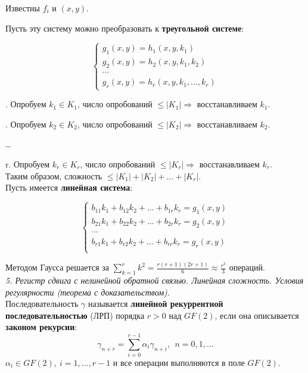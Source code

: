 \noindent Известны $f_i$ и $(x, y)$.

Пусть эту систему можно преобразовать к \textbf{треугольной системе}:

\begin{equation*}
    \begin{cases}
    g_1 (x, y) = h_1 (x, y, k_1) \\
    g_2 (x, y) = h_2 (x, y, k_1, k_2) \\
    \cdots \\
    g_r (x, y) = h_r (x, y, k_1, \ldots, k_r) 
    \end{cases}
\end{equation*}

. Опробуем $k_1 \in K_1$, число опробований $\le |K_1| \Rightarrow$ восстанавливаем $k_1$.

. Опробуем $k_2 \in K_2$, число опробований $\le |K_2| \Rightarrow$ восстанавливаем $k_2$.

\noindent \ldots

\noindent r. Опробуем $k_r \in K_r$, число опробований $\le |K_r| \Rightarrow$ восстанавливаем $k_r$. \\

\noindent Таким образом, сложность $\le |K_1| + |K_2| + \ldots + |K_r|$. \\

Пусть имеется \textbf{линейная система}:

\begin{equation*}
    \begin{cases}
    b_{11} k_1 + b_{12} k_2 + \ldots + b_{1r} k_r = g_1 (x, y)  \\
    b_{21} k_1 + b_{22} k_2 + \ldots + b_{2r} k_r = g_2 (x, y)  \\
    \cdots \\
    b_{r1} k_1 + b_{r2} k_2 + \ldots + b_{rr} k_r = g_r (x, y)  \\
    \end{cases}
\end{equation*}

\noindent Методом Гаусса решается за $\sum_{k=1}^r k^2 = \frac{r(r + 1)(2 r + 1)}{6} \approx \frac{r^3}{3}$ операций. \\

\noindent \textit{5. Регистр сдвига с нелинейной обратной связью. Линейная сложность. Условия регулярности (теорема с доказательством).} \\

Последовательность $\gamma$ называется \textbf{линейной рекуррентной последовательностью} (ЛРП) порядка $r > 0$ над $GF(2)$, если она описывается \textbf{законом рекурсии}:
$$\gamma_{n+r} = \sum_{i=0}^{r-1} \alpha_i \gamma_{n+i},\ \ n = 0,1,\ldots$$
\noindent $\alpha_i \in GF(2),\ i=1,\ldots,r-1$ и все операции выполняются в поле $GF(2)$.

